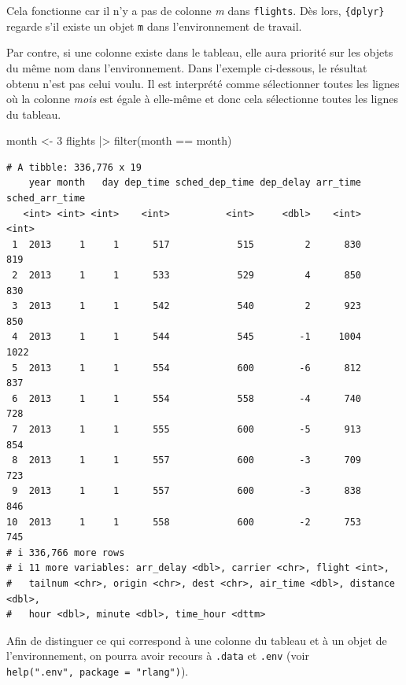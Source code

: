 \documentclass[
  letterpaper,
  DIV=11,
  numbers=noendperiod,
  oneside]{scrreprt}
\newenvironment{Shaded}{\begin{snugshade}}{\end{snugshade}}
\newcommand{\DecValTok}[1]{\textcolor[rgb]{0.68,0.00,0.00}{#1}}
\newcommand{\FunctionTok}[1]{\textcolor[rgb]{0.28,0.35,0.67}{#1}}
\newcommand{\NormalTok}[1]{\textcolor[rgb]{0.00,0.23,0.31}{#1}}
\newcommand{\OtherTok}[1]{\textcolor[rgb]{0.00,0.23,0.31}{#1}}
\newcommand{\SpecialCharTok}[1]{\textcolor[rgb]{0.37,0.37,0.37}{#1}}
\begin{document}
\begin{tcolorbox}
Cela fonctionne car il n'y a pas de colonne \emph{m} dans
\texttt{flights}. Dès lors, \texttt{\{dplyr\}} regarde s'il existe un
objet \texttt{m} dans l'environnement de travail.

Par contre, si une colonne existe dans le tableau, elle aura priorité
sur les objets du même nom dans l'environnement. Dans l'exemple
ci-dessous, le résultat obtenu n'est pas celui voulu. Il est interprété
comme sélectionner toutes les lignes où la colonne \emph{mois} est égale
à elle-même et donc cela sélectionne toutes les lignes du tableau.

\begin{Shaded}
\begin{Highlighting}[]
\NormalTok{month }\OtherTok{\textless{}{-}} \DecValTok{3}
\NormalTok{flights }\SpecialCharTok{|\textgreater{}} 
  \FunctionTok{filter}\NormalTok{(month }\SpecialCharTok{==}\NormalTok{ month)}
\end{Highlighting}
\end{Shaded}

\begin{verbatim}
# A tibble: 336,776 x 19
    year month   day dep_time sched_dep_time dep_delay arr_time sched_arr_time
   <int> <int> <int>    <int>          <int>     <dbl>    <int>          <int>
 1  2013     1     1      517            515         2      830            819
 2  2013     1     1      533            529         4      850            830
 3  2013     1     1      542            540         2      923            850
 4  2013     1     1      544            545        -1     1004           1022
 5  2013     1     1      554            600        -6      812            837
 6  2013     1     1      554            558        -4      740            728
 7  2013     1     1      555            600        -5      913            854
 8  2013     1     1      557            600        -3      709            723
 9  2013     1     1      557            600        -3      838            846
10  2013     1     1      558            600        -2      753            745
# i 336,766 more rows
# i 11 more variables: arr_delay <dbl>, carrier <chr>, flight <int>,
#   tailnum <chr>, origin <chr>, dest <chr>, air_time <dbl>, distance <dbl>,
#   hour <dbl>, minute <dbl>, time_hour <dttm>
\end{verbatim}

Afin de distinguer ce qui correspond à une colonne du tableau et à un
objet de l'environnement, on pourra avoir recours à \texttt{.data} et
\texttt{.env} (voir \texttt{help(".env",\ package\ =\ "rlang")}).


\end{tcolorbox}
\end{document}
